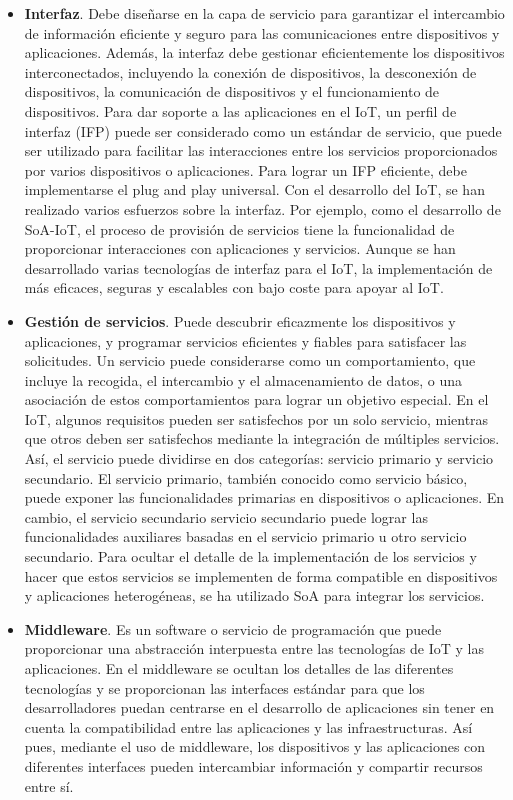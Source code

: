 {\begin{itemize}
    \item \textbf{Interfaz}. Debe diseñarse en la capa de servicio para garantizar el intercambio de información eficiente y seguro para las comunicaciones entre dispositivos y aplicaciones. Además, la interfaz debe gestionar eficientemente los dispositivos interconectados, incluyendo la conexión de dispositivos, la desconexión de dispositivos, la comunicación de dispositivos y el funcionamiento de dispositivos. Para dar soporte a las aplicaciones en el IoT, un perfil de interfaz (IFP) puede ser considerado como un estándar de servicio, que puede ser utilizado para facilitar las interacciones entre los servicios proporcionados por varios dispositivos o aplicaciones. Para lograr un IFP eficiente, debe implementarse el plug and play universal. Con el desarrollo del IoT, se han realizado varios esfuerzos sobre la interfaz. Por ejemplo, como el desarrollo de SoA-IoT, el proceso de provisión de servicios tiene la funcionalidad de proporcionar interacciones con aplicaciones y servicios. Aunque se han desarrollado varias tecnologías de interfaz para el IoT, la implementación de más eficaces, seguras y escalables con bajo coste para apoyar al IoT.
    \item \textbf{Gestión de servicios}. Puede descubrir eficazmente los dispositivos y aplicaciones, y programar servicios eficientes y fiables para satisfacer las solicitudes. Un servicio puede considerarse como un comportamiento, que incluye la recogida, el intercambio y el almacenamiento de datos, o una asociación de estos comportamientos para lograr un objetivo especial. En el IoT, algunos requisitos pueden ser satisfechos por un solo servicio, mientras que otros deben ser satisfechos mediante la integración de múltiples servicios. Así, el servicio puede dividirse en dos categorías: servicio primario y servicio secundario. El servicio primario, también conocido como servicio básico, puede exponer las funcionalidades primarias en dispositivos o aplicaciones. En cambio, el servicio secundario servicio secundario puede lograr las funcionalidades auxiliares basadas en el servicio primario u otro servicio secundario. Para ocultar el detalle de la implementación de los servicios y hacer que estos servicios se implementen de forma compatible en dispositivos y aplicaciones heterogéneas, se ha utilizado SoA para integrar los servicios. 
    \item \textbf{Middleware}. Es un software o servicio de programación que puede proporcionar una abstracción interpuesta entre las tecnologías de IoT y las aplicaciones. En el middleware se ocultan los detalles de las diferentes tecnologías y se proporcionan las interfaces estándar para que los desarrolladores puedan centrarse en el desarrollo de aplicaciones sin tener en cuenta la compatibilidad entre las aplicaciones y las infraestructuras. Así pues, mediante el uso de middleware, los dispositivos y las aplicaciones con diferentes interfaces pueden intercambiar información y compartir recursos entre sí. \cite{lin2017survey}
\end{itemize}


}
